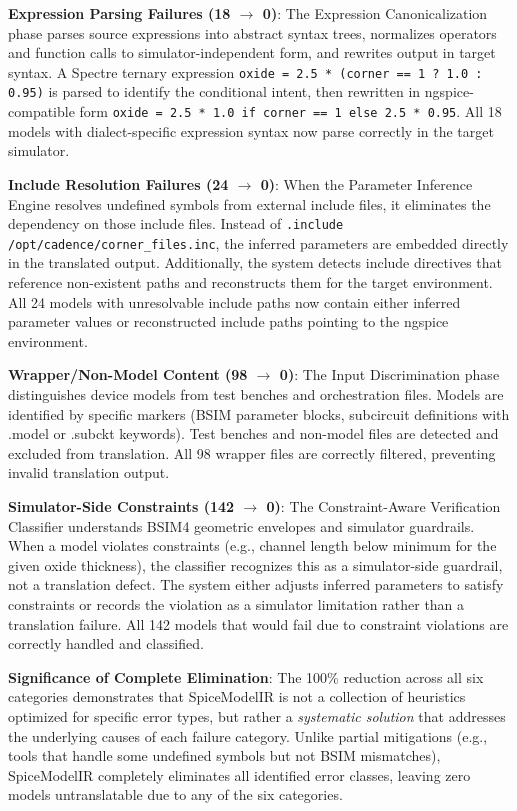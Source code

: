 \documentclass[conference]{IEEEtran}
\begin{document}
\textbf{Expression Parsing Failures (18 $\rightarrow$ 0)}: The Expression Canonicalization phase parses source expressions into abstract syntax trees, normalizes operators and function calls to simulator-independent form, and rewrites output in target syntax. A Spectre ternary expression \texttt{oxide = 2.5 * (corner == 1 ? 1.0 : 0.95)} is parsed to identify the conditional intent, then rewritten in ngspice-compatible form \texttt{oxide = 2.5 * 1.0 if corner == 1 else 2.5 * 0.95}. All 18 models with dialect-specific expression syntax now parse correctly in the target simulator.

\textbf{Include Resolution Failures (24 $\rightarrow$ 0)}: When the Parameter Inference Engine resolves undefined symbols from external include files, it eliminates the dependency on those include files. Instead of \texttt{.include /opt/cadence/corner\_files.inc}, the inferred parameters are embedded directly in the translated output. Additionally, the system detects include directives that reference non-existent paths and reconstructs them for the target environment. All 24 models with unresolvable include paths now contain either inferred parameter values or reconstructed include paths pointing to the ngspice environment.

\textbf{Wrapper/Non-Model Content (98 $\rightarrow$ 0)}: The Input Discrimination phase distinguishes device models from test benches and orchestration files. Models are identified by specific markers (BSIM parameter blocks, subcircuit definitions with .model or .subckt keywords). Test benches and non-model files are detected and excluded from translation. All 98 wrapper files are correctly filtered, preventing invalid translation output.

\textbf{Simulator-Side Constraints (142 $\rightarrow$ 0)}: The Constraint-Aware Verification Classifier understands BSIM4 geometric envelopes and simulator guardrails. When a model violates constraints (e.g., channel length below minimum for the given oxide thickness), the classifier recognizes this as a simulator-side guardrail, not a translation defect. The system either adjusts inferred parameters to satisfy constraints or records the violation as a simulator limitation rather than a translation failure. All 142 models that would fail due to constraint violations are correctly handled and classified.

\textbf{Significance of Complete Elimination}: The 100\% reduction across all six categories demonstrates that SpiceModelIR is not a collection of heuristics optimized for specific error types, but rather a \textit{systematic solution} that addresses the underlying causes of each failure category. Unlike partial mitigations (e.g., tools that handle some undefined symbols but not BSIM mismatches), SpiceModelIR completely eliminates all identified error classes, leaving zero models untranslatable due to any of the six categories.
\end{document}
